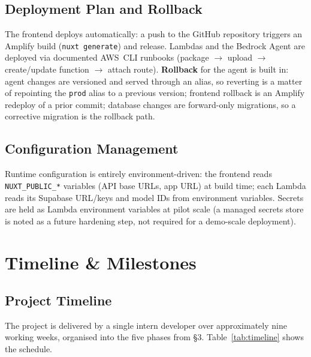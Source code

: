 \documentclass[a4paper,11pt]{article}
\begin{document}
	\subsection{Deployment Plan and Rollback}
	The frontend deploys automatically: a push to the GitHub repository triggers an Amplify
	build (\texttt{nuxt generate}) and release. Lambdas and the Bedrock Agent are deployed via
	documented AWS~CLI runbooks (package \(\rightarrow\) upload \(\rightarrow\) create/update
	function \(\rightarrow\) attach route). \textbf{Rollback} for the agent is built in: agent
	changes are versioned and served through an alias, so reverting is a matter of repointing
	the \texttt{prod} alias to a previous version; frontend rollback is an Amplify redeploy of a
	prior commit; database changes are forward-only migrations, so a corrective migration is the
	rollback path.

	\subsection{Configuration Management}
	Runtime configuration is entirely environment-driven: the frontend reads
	\texttt{NUXT\_PUBLIC\_*} variables (API base URLs, app URL) at build time; each Lambda reads
	its Supabase URL/keys and model IDs from environment variables. Secrets are held as Lambda
	environment variables at pilot scale (a managed secrets store is noted as a future
	hardening step, not required for a demo-scale deployment).

	\section{Timeline \& Milestones}

	\subsection{Project Timeline}
	The project is delivered by a single intern developer over approximately nine working
	weeks, organised into the five phases from \S3. Table~\ref{tab:timeline} shows the schedule.
\end{document}
